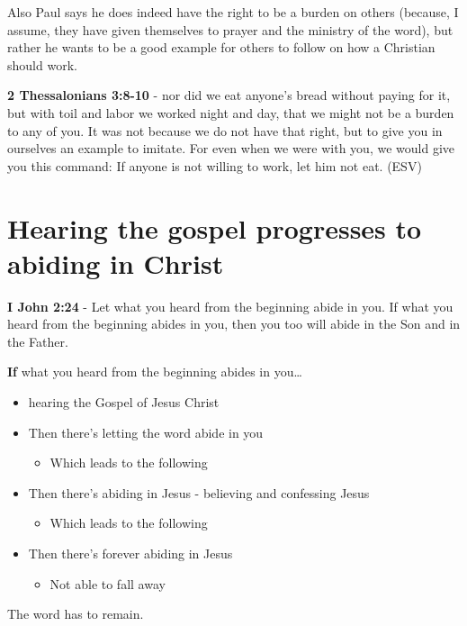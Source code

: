 \documentclass[11pt]{article}
\begin{document}
Also Paul says he does indeed have the right to be a burden on others (because, I assume, they have given themselves to prayer and the ministry of the word), but rather he wants to be a good example for others to follow on how a Christian should work.

\textbf{2 Thessalonians 3:8-10} - nor did we eat anyone's bread without paying for it, but with toil and labor we worked night and day, that we might not be a burden to any of you. It was not because we do not have that right, but to give you in ourselves an example to imitate. For even when we were with you, we would give you this command: If anyone is not willing to work, let him not eat. (ESV)

\section{Hearing the gospel progresses to abiding in Christ}
\label{sec:orge5c5b47}
\textbf{I John 2:24} - Let what you heard from the beginning abide in you. If what you heard from the beginning abides in you, then you too will abide in the Son and in the Father.

\textbf{If} what you heard from the beginning abides in you\ldots{}

\begin{itemize}
\item hearing the Gospel of Jesus Christ
\item Then there's letting the word abide in you
\begin{itemize}
\item Which leads to the following
\end{itemize}
\item Then there's abiding in Jesus - believing and confessing Jesus
\begin{itemize}
\item Which leads to the following
\end{itemize}
\item Then there's forever abiding in Jesus
\begin{itemize}
\item Not able to fall away
\end{itemize}
\end{itemize}

The word has to remain.
\end{document}

